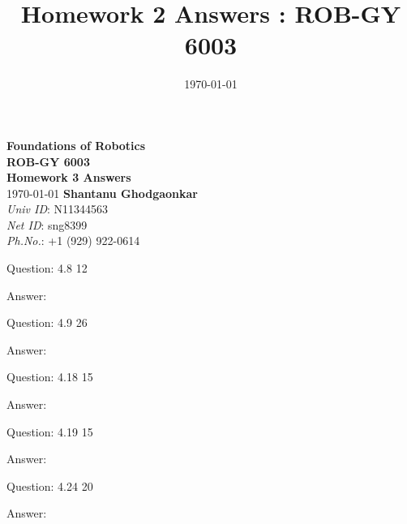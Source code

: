 \documentclass[a4paper]{article}
\title{Homework 2 Answers : ROB-GY 6003}
\author{\myName}
\date{\today}
\newcommand{\myName}{\textbf{Shantanu Ghodgaonkar}\\\textit{Univ ID}: N11344563\\\textit{Net ID}: sng8399\\\textit{Ph.No.}: +1 (929) 922-0614}
\begin{document}
	
	\begin{titlepage}
	    \centering
	    \vspace{2cm}
	    \Huge\textbf{Foundations of Robotics \\ ROB-GY 6003 \\ Homework 3 Answers}
	    \vspace{1cm}
	    \\ \Large \today
	    \vfill 
	    \Large \myName
	\end{titlepage}
	
	\begin{qalist}			
		\item[Question: 4.8] \setcounter{equation}{0} 12
		\item[Answer:] 
			
		\item[Question: 4.9] \setcounter{equation}{0} 26
		\item[Answer:] 
		
		\item[Question: 4.18] \setcounter{equation}{0} 15
		\item[Answer:] 
		
		\item[Question: 4.19] \setcounter{equation}{0} 15
		\item[Answer:] 
		
		\item[Question: 4.24] \setcounter{equation}{0} 20
		\item[Answer:] 
	\end{qalist}
\end{document}
